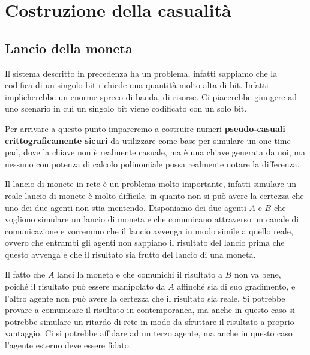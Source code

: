 \chapter{Costruzione della casualità}

\section{Lancio della moneta}
Il sistema descritto in precedenza ha un problema, infatti sappiamo che 
la codifica di un singolo bit richiede una quantità molto alta di bit. Infatti 
implicherebbe un enorme spreco di banda, di risorse. Ci piacerebbe giungere 
ad uno scenario in cui un singolo bit viene codificato con un solo bit.

Per arrivare a questo punto impareremo a costruire numeri \textbf{pseudo-casuali
crittograficamente sicuri} da utilizzare come base per simulare un one-time pad, 
dove la chiave non è realmente casuale, ma è una chiave generata da noi, 
ma nessuno con potenza di calcolo polinomiale possa realmente notare la 
differenza.

Il lancio di monete in rete è un problema molto importante, infatti simulare 
un reale lancio di monete è molto difficile, in quanto non si può avere
la certezza che uno dei due agenti non stia mentendo.
Disponiamo dei due agenti $A$ e $B$ che vogliono simulare un
lancio di moneta e che comunicano attraverso un canale di comunicazione
e vorremmo che il lancio avvenga in modo simile a quello reale, ovvero
che entrambi gli agenti non sappiano il risultato del lancio prima che
questo avvenga e che il risultato sia frutto del lancio di una moneta.

Il fatto che $A$ lanci la moneta e che comunichi il risultato a $B$ non
va bene, poiché il risultato può essere manipolato da $A$ affinché sia 
di suo gradimento, e l'altro agente non può avere la certezza che il
risultato sia reale.
Si potrebbe provare a comunicare il risultato in contemporanea, ma anche
in questo caso si potrebbe simulare un ritardo di rete in modo da 
sfruttare il risultato a proprio vantaggio.
Ci si potrebbe affidare ad un terzo agente, ma anche in questo caso
l'agente esterno deve essere fidato.

